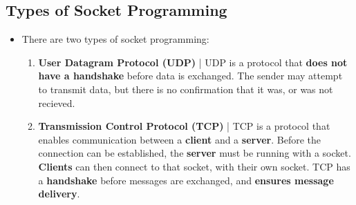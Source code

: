\documentclass[16pt]{article}
\begin{document}
    \subsection*{Types of Socket Programming}
    \begin{itemize}
        \item There are two types of socket programming:
        \begin{enumerate}
            \item \textbf{User Datagram Protocol (UDP)} | UDP is a protocol that \textbf{does not have a handshake} before data is exchanged. The sender may attempt to transmit data, but there is no confirmation that it was, or was not recieved.
            \item \textbf{Transmission Control Protocol (TCP)} | TCP is a protocol that enables communication between a \textbf{client} and a \textbf{server}. Before the connection can be established, the \textbf{server} must be running with a socket. \textbf{Clients} can then connect to that socket, with their own socket. TCP has a \textbf{handshake} before messages are exchanged, and \textbf{ensures message delivery}.
        \end{enumerate}
    \end{itemize}
\end{document}
